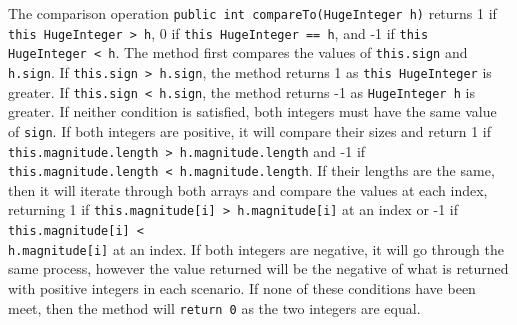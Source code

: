 \documentclass[12pt]{article}
\newcommand{\code}[1]{\texttt{#1}}
\begin{document}
The comparison operation \code{public int compareTo(HugeInteger h)} returns 1 if \\ \code{this HugeInteger > h}, 0 if \code{this HugeInteger == h}, and -1 if \code{this HugeInteger < h}. The method first compares the values of \code{this.sign} and \code{h.sign}. If \code{this.sign > h.sign}, the method returns 1 as \code{this HugeInteger} is greater. If \code{this.sign < h.sign}, the method returns -1 as \code{HugeInteger h} is greater. If neither condition is satisfied, both integers must have the same value of \code{sign}. If both integers are positive, it will compare their sizes and return 1 if \code{this.magnitude.length > h.magnitude.length} and -1 if \\ \code{this.magnitude.length < h.magnitude.length}. If their lengths are the same, then it will iterate through both arrays and compare the values at each index, returning 1 if \code{this.magnitude[i] > h.magnitude[i]} at an index or -1 if \code{this.magnitude[i] <} \\ \code{h.magnitude[i]} at an index. If both integers are negative, it will go through the same process, however the value returned will be the negative of what is returned with positive integers in each scenario. If none of these conditions have been meet, then the method will \code{return 0} as the two integers are equal.   
\end{document}
